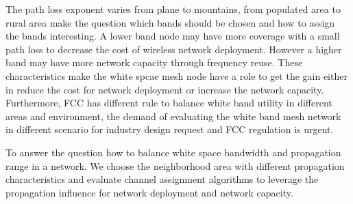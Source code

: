 The path loss exponent varies from plane to mountains, from populated area to rural area make the question which bands should be chosen and how to assign the bands interesting.
A lower band node may have more coverage with a small path loss to decrease the cost of wireless network deployment. However a higher band may have more network capacity through frequency reuse.
These characteristics make the white spcae mesh node have a role to get the gain either in reduce the cost for network deployment or increase the network capacity.
Furthermore, FCC has different rule to balance white band utility in different areas and environment, the demand of evaluating the white band mesh network in different scenario for industry design request and FCC regulation is urgent.

To answer the question how to balance white space bandwidth and propagation range in a network.  
We choose the neighborhood area with different propagation characteristics and evaluate channel assignment algorithms to leverage the propagation influence for network deployment and network capacity.
